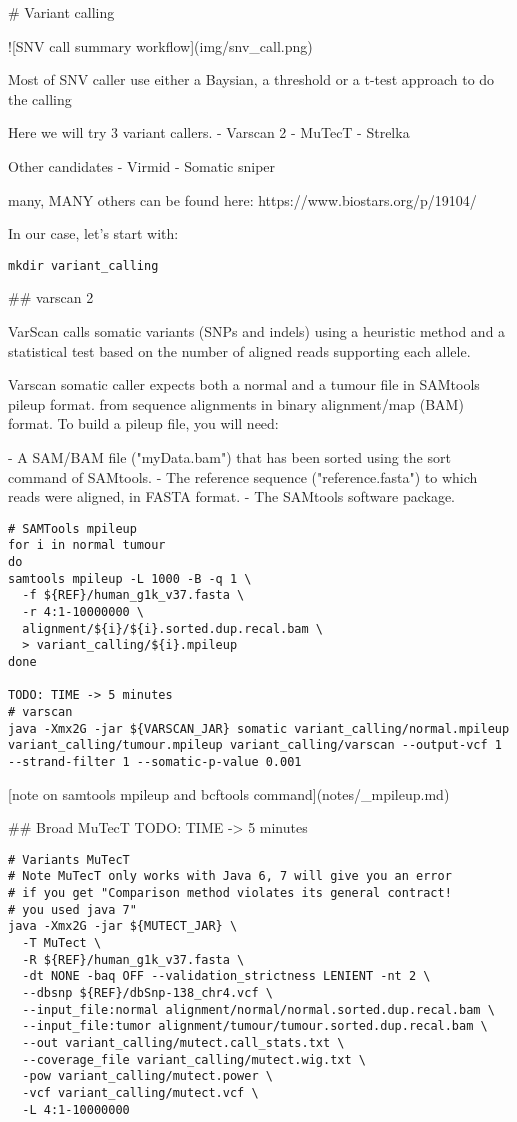 # Variant calling

![SNV call summary workflow](img/snv_call.png)

Most of SNV caller use either a Baysian, a threshold or a t-test approach to do the calling

 Here we will try 3 variant callers.
- Varscan 2
- MuTecT
- Strelka

Other candidates
- Virmid
- Somatic sniper

many, MANY others can be found here:
https://www.biostars.org/p/19104/


In our case, let's start with:

\begin{lstlisting}
mkdir variant_calling
\end{lstlisting}

## varscan 2

VarScan calls somatic variants (SNPs and indels) using a heuristic method and a statistical test based on the number of aligned reads supporting each allele.


Varscan somatic caller expects both a normal and a tumour file in SAMtools pileup format. from sequence alignments in binary alignment/map (BAM) format. To build a pileup file, you will need:

- A SAM/BAM file ("myData.bam") that has been sorted using the sort command of SAMtools.
- The reference sequence ("reference.fasta") to which reads were aligned, in FASTA format.
- The SAMtools software package.


\begin{lstlisting}
# SAMTools mpileup
for i in normal tumour
do
samtools mpileup -L 1000 -B -q 1 \
  -f ${REF}/human_g1k_v37.fasta \
  -r 4:1-10000000 \
  alignment/${i}/${i}.sorted.dup.recal.bam \
  > variant_calling/${i}.mpileup
done

TODO: TIME -> 5 minutes
# varscan
java -Xmx2G -jar ${VARSCAN_JAR} somatic variant_calling/normal.mpileup variant_calling/tumour.mpileup variant_calling/varscan --output-vcf 1 --strand-filter 1 --somatic-p-value 0.001 
\end{lstlisting}

[note on samtools mpileup and bcftools command](notes/_mpileup.md)

## Broad MuTecT
TODO: TIME -> 5 minutes
\begin{lstlisting}
# Variants MuTecT
# Note MuTecT only works with Java 6, 7 will give you an error
# if you get "Comparison method violates its general contract!
# you used java 7"
java -Xmx2G -jar ${MUTECT_JAR} \
  -T MuTect \
  -R ${REF}/human_g1k_v37.fasta \
  -dt NONE -baq OFF --validation_strictness LENIENT -nt 2 \
  --dbsnp ${REF}/dbSnp-138_chr4.vcf \
  --input_file:normal alignment/normal/normal.sorted.dup.recal.bam \
  --input_file:tumor alignment/tumour/tumour.sorted.dup.recal.bam \
  --out variant_calling/mutect.call_stats.txt \
  --coverage_file variant_calling/mutect.wig.txt \
  -pow variant_calling/mutect.power \
  -vcf variant_calling/mutect.vcf \
  -L 4:1-10000000
\end{lstlisting}


